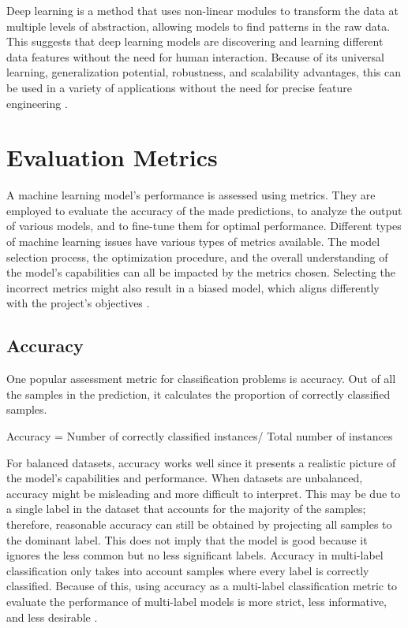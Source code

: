 Deep learning is a method that uses non-linear modules to transform the data at multiple levels of abstraction, allowing models to find patterns in the raw data. This suggests that deep learning models are discovering and learning different data features without the need for human interaction. Because of its universal learning, generalization potential, robustness, and scalability advantages, this can be used in a variety of applications without the need for precise feature engineering \citep{helland_tackling_2023}.

\section{Evaluation Metrics}

A machine learning model's performance is assessed using metrics. They are employed to evaluate the accuracy of the made predictions, to analyze the output of various models, and to fine-tune them for optimal performance. Different types of machine learning issues have various types of metrics available. The model selection process, the optimization procedure, and the overall understanding of the model's capabilities can all be impacted by the metrics chosen. Selecting the incorrect metrics might also result in a biased model, which aligns differently with the project's objectives \citep{helland_tackling_2023}.

\subsection{Accuracy}

One popular assessment metric for classification problems is accuracy. Out of all the samples in the prediction, it calculates the proportion of correctly classified samples. 

Accuracy = Number of correctly classified instances/ Total number of instances

For balanced datasets, accuracy works well since it presents a realistic picture of the model's capabilities and performance. When datasets are unbalanced, accuracy might be misleading and more difficult to interpret. This may be due to a single label in the dataset that accounts for the majority of the samples; therefore, reasonable accuracy can still be obtained by projecting all samples to the dominant label. This does not imply that the model is good because it ignores the less common but no less significant labels. Accuracy in multi-label classification only takes into account samples where every label is correctly classified. Because of this, using accuracy as a multi-label classification metric to evaluate the performance of multi-label models is more strict, less informative, and less desirable \citep{helland_tackling_2023}.

